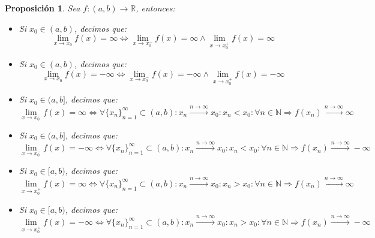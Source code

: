 \documentclass[10pt,a4paper,openright]{book}
\theoremstyle{break}
\newtheorem*{prop}{Proposición}
\begin{document}
\begin{prop}
Sea $f: (a,b)\longrightarrow \mathbb R$, entonces:
\begin{itemize}
\item Si $x_0\in (a,b)$, decimos que:
$$\lim_{x\rightarrow x_0}f(x)=\infty\Leftrightarrow \lim_{x\rightarrow x_0^-}f(x)=\infty \wedge \lim_{x\rightarrow x_0^+}f(x)=\infty$$

\item Si $x_0\in (a,b)$, decimos que:
$$\lim_{x\rightarrow x_0}f(x)=-\infty\Leftrightarrow \lim_{x\rightarrow x_0^-}f(x)=-\infty \wedge \lim_{x\rightarrow x_0^+}f(x)=-\infty$$

\item Si $x_0\in (a,b]$, decimos que:
$$\lim_{x\rightarrow x_0^-}f(x)=\infty\Leftrightarrow \forall \{x_n\}_{n=1}^\infty \subset (a,b): x_n\xrightarrow{n\rightarrow\infty} x_0: x_n<x_0: \forall n\in \mathbb N\Rightarrow f(x_n)\xrightarrow{n\rightarrow \infty} \infty$$

\item Si $x_0\in (a,b]$, decimos que:
$$\lim_{x\rightarrow x_0^-}f(x)=-\infty\Leftrightarrow \forall \{x_n\}_{n=1}^\infty \subset (a,b): x_n\xrightarrow{n\rightarrow\infty} x_0: x_n<x_0: \forall n\in \mathbb N\Rightarrow f(x_n)\xrightarrow{n\rightarrow \infty} -\infty$$

\item Si $x_0\in [a,b)$, decimos que:
$$\lim_{x\rightarrow x_0^+}f(x)=\infty\Leftrightarrow \forall \{x_n\}_{n=1}^\infty \subset (a,b): x_n\xrightarrow{n\rightarrow\infty} x_0: x_n>x_0: \forall n\in \mathbb N\Rightarrow f(x_n)\xrightarrow{n\rightarrow \infty} \infty$$

\item Si $x_0\in [a,b)$, decimos que:
$$\lim_{x\rightarrow x_0^+}f(x)=-\infty\Leftrightarrow \forall \{x_n\}_{n=1}^\infty \subset (a,b): x_n\xrightarrow{n\rightarrow\infty} x_0: x_n>x_0: \forall n\in \mathbb N\Rightarrow f(x_n)\xrightarrow{n\rightarrow \infty} -\infty$$
\end{itemize}
\end{prop}
\end{document}
